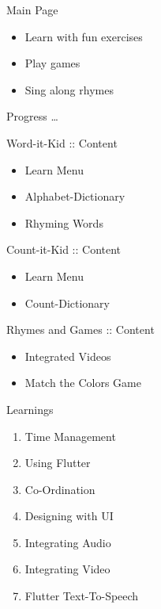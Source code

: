 \documentclass[14pt]{beamer}
\begin{document}
\begin{frame}{Main Page}
    \begin{itemize}
            \pause
        \item Learn with fun exercises \\
            \pause
        \item Play games \\
            \pause
        \item Sing along rhymes
    \end{itemize}
\end{frame}

\begin{frame}[standout]
    \alert{Progress \ldots}
\end{frame}

\begin{frame}{Word-it-Kid :: Content}
    \begin{itemize}
            \pause
	\item Learn Menu
	    \pause
        \item Alphabet-Dictionary
            \pause
	\item Rhyming Words
    \end{itemize}
\end{frame}

\begin{frame}{Count-it-Kid :: Content}
    \begin{itemize}
            \pause
        \item Learn Menu
            \pause
        \item Count-Dictionary
    \end{itemize}
\end{frame}

\begin{frame}{Rhymes and Games :: Content}
    \begin{itemize}
            \pause
        \item Integrated Videos
            \pause
        \item Match the Colors Game
    \end{itemize}
\end{frame}

\begin{frame}{Learnings}
    \begin{enumerate}
        \item Time Management
        \item Using Flutter
        \item Co-Ordination
        \item Designing with UI
	\item Integrating Audio
	\item Integrating Video
	\item Flutter Text-To-Speech
    \end{enumerate}
\end{frame}
\end{document}
